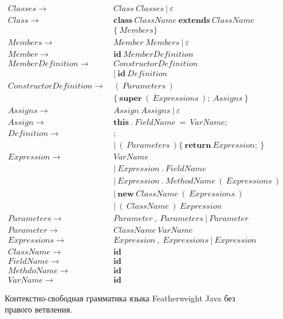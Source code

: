 \begin{figure}
    \begin{align*}
        Classes \rightarrow&\ Class\ Classes\ |\ \varepsilon\\
        Class \rightarrow&\ \pmb{class}\ ClassName\ \pmb{extends}\ ClassName\\
        &\ \{\ Members \}\\
        Members \rightarrow&\ Member\ Members\ |\ \varepsilon\\
        Member \rightarrow&\ \pmb{id}\ MemberDefinition\\
        MemberDefinition \rightarrow&\ ConstructorDefinition\\
        &\ |\ \pmb{id}\ Definition\\
        ConstructorDefinition \rightarrow&\ (\ Parameters\ )\\
        &\ \{\ \pmb{super}\ (\ Expressions\ );\ Assigns\ \}\\
        Assigns \rightarrow&\ Assign\ Assigns\ |\ \varepsilon\\
        Assign \rightarrow&\ \pmb{this}\ .\ FieldName\ =\ VarName;\\
        Definition \rightarrow&\ ;\\
        &\ |\ (\ Parameters\ ) \{\ \pmb{return}\ Expression;\ \}\\
        Expression \rightarrow&\ VarName\\
        &\ |\ Expression\ .\ FieldName\\
        &\ |\ Expression\ .\ MethodName\ (\ Expressions\ )\\
        &\ |\ \pmb{new}\ ClassName\ (\ Expressions\ )\\
        &\ |\ (\ ClassName\ )\ Expression\\
        Parameters \rightarrow&\ Parameter\ ,\ Parameters\ |\ Parameter\\
        Parameter \rightarrow&\ ClassName\ VarName\\
        Expressions \rightarrow&\ Expression\ ,\ Expressions\ |\ Expression\\
        ClassName \rightarrow&\ \pmb{id}\\
        FieldName \rightarrow&\ \pmb{id}\\
        MethdoName \rightarrow&\ \pmb{id}\\
        VarName \rightarrow&\ \pmb{id}
    \end{align*}
    \caption{Контекстно-свободная грамматика языка Featherweight Java без правого ветвления.}
    \label{cf-fj-happy}
\end{figure}
